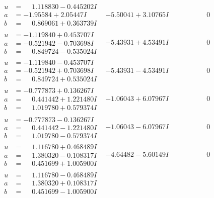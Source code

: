 \documentclass[1p]{elsarticle_modified}
\theoremstyle{definition}
\begin{document}
$$\begin{array}{c|c|c}
\begin{aligned}
u &= \phantom{-}1.118830 - 0.445202 I \\
a &= -1.95584 + 2.05447 I \\
b &= \phantom{-}0.869061 + 0.363739 I\end{aligned}
 & -5.50041 + 3.10765 I & \phantom{-0.000000 } 0 \\ \hline\begin{aligned}
u &= -1.119840 + 0.453707 I \\
a &= -0.521942 - 0.703698 I \\
b &= \phantom{-}0.849724 - 0.535024 I\end{aligned}
 & -5.43931 + 4.53491 I & \phantom{-0.000000 } 0 \\ \hline\begin{aligned}
u &= -1.119840 - 0.453707 I \\
a &= -0.521942 + 0.703698 I \\
b &= \phantom{-}0.849724 + 0.535024 I\end{aligned}
 & -5.43931 - 4.53491 I & \phantom{-0.000000 } 0 \\ \hline\begin{aligned}
u &= -0.777873 + 0.136267 I \\
a &= \phantom{-}0.441442 + 1.221480 I \\
b &= \phantom{-}1.019780 + 0.579374 I\end{aligned}
 & -1.06043 + 6.07967 I & \phantom{-0.000000 } 0 \\ \hline\begin{aligned}
u &= -0.777873 - 0.136267 I \\
a &= \phantom{-}0.441442 - 1.221480 I \\
b &= \phantom{-}1.019780 - 0.579374 I\end{aligned}
 & -1.06043 - 6.07967 I & \phantom{-0.000000 } 0 \\ \hline\begin{aligned}
u &= \phantom{-}1.116780 + 0.468489 I \\
a &= \phantom{-}1.380320 - 0.108317 I \\
b &= \phantom{-}0.451699 + 1.005900 I\end{aligned}
 & -4.64482 - 5.60149 I & \phantom{-0.000000 } 0 \\ \hline\begin{aligned}
u &= \phantom{-}1.116780 - 0.468489 I \\
a &= \phantom{-}1.380320 + 0.108317 I \\
b &= \phantom{-}0.451699 - 1.005900 I\end{aligned}

\end{array}$$
\end{document}
